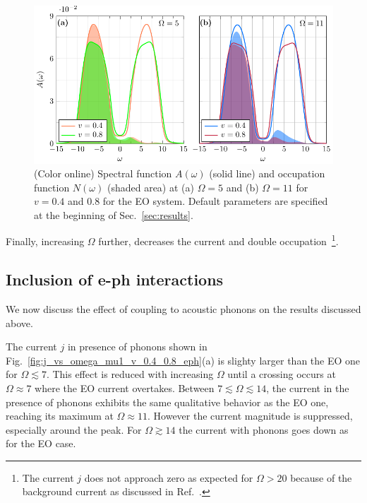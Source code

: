 \documentclass[aps,prb,groupedaddress,showpacs,twocolumn,superscriptaddress,10pt]{revtex4-2}
\begin{document}
\begin{figure}[b] 
\includegraphics[width=\linewidth]{./figures_Paper1/spec_filling_mu1_v_0.4_0.8_O_5_11_e.pdf}
\caption{(Color online) Spectral function $A(\omega)$ (solid line) and occupation function $N(\omega)$ (shaded area) at (a) $\Omega=5$ and (b) $\Omega=11$ for $v=0.4$ and $0.8$ for the EO system. Default parameters are specified at the beginning of Sec.~\ref{sec:results}.}
\label{fig:spec_filling_mu1_v_0.4_0.8_O_5_11_e}
\end{figure} 

Finally, increasing $\Omega$ further, decreases the current and double occupation~\footnote{The current $j$ does not approach zero as expected for $\Omega>20$ because of the background current as discussed in Ref.~\cite{so.do.18}.}.

\subsection{Inclusion of e-ph interactions}
\label{sec:E0_2_electrons_phonons} 

We now discuss the effect of coupling to acoustic phonons on the results discussed above.
 
The current $j$ in presence of phonons shown in Fig.~\ref{fig:j_vs_omega_mu1_v_0.4_0.8_eph}(a) is slighty larger than the EO one for $\Omega\lesssim7$. This effect is reduced with increasing $\Omega$ until a crossing occurs at $\Omega\approx7$ where the EO current overtakes. Between $7\lesssim\Omega\lesssim14$, the current in the presence of phonons exhibits the same qualitative behavior as the EO one, reaching its maximum at $\Omega\approx 11$. However the current magnitude is suppressed, especially around the peak. For $\Omega\gtrsim14$ the current with phonons goes down as for the EO case.
\end{document}
